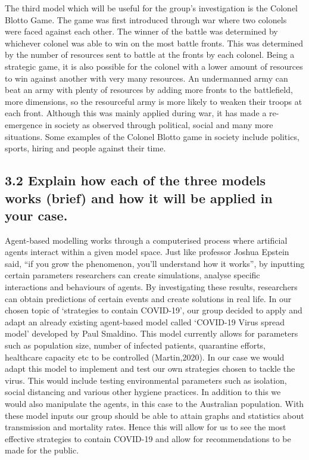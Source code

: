 \documentclass[11pt]{article}
\begin{document}
    The third model which will be useful for the group's investigation is
the Colonel Blotto Game. The game was first introduced through war where
two colonels were faced against each other. The winner of the battle was
determined by whichever colonel was able to win on the most battle
fronts. This was determined by the number of resources sent to battle at
the fronts by each colonel. Being a strategic game, it is also possible
for the colonel with a lower amount of resources to win against another
with very many resources. An undermanned army can beat an army with
plenty of resources by adding more fronts to the battlefield, more
dimensions, so the resourceful army is more likely to weaken their
troops at each front. Although this was mainly applied during war, it
has made a re-emergence in society as observed through political, social
and many more situations. Some examples of the Colonel Blotto game in
society include politics, sports, hiring and people against their time.

    \hypertarget{explain-how-each-of-the-three-models-works-brief-and-how-it-will-be-applied-in-your-case.}{%
\subsection{3.2 Explain how each of the three models works (brief) and
how it will be applied in your
case.}\label{explain-how-each-of-the-three-models-works-brief-and-how-it-will-be-applied-in-your-case.}}

    Agent-based modelling works through a computerised process where
artificial agents interact within a given model space. Just like
professor Joshua Epstein said, ``if you grow the phenomenon, you'll
understand how it works'', by inputting certain parameters researchers
can create simulations, analyse specific interactions and behaviours of
agents. By investigating these results, researchers can obtain
predictions of certain events and create solutions in real life. In our
chosen topic of `strategies to contain COVID-19', our group decided to
apply and adapt an already existing agent-based model called `COVID-19
Virus spread model' developed by Paul Smaldino. This model currently
allows for parameters such as population size, number of infected
patients, quarantine efforts, healthcare capacity etc to be controlled
(Martin,2020). In our case we would adapt this model to implement and
test our own strategies chosen to tackle the virus. This would include
testing environmental parameters such as isolation, social distancing
and various other hygiene practices. In addition to this we would also
manipulate the agents, in this case to the Australian population. With
these model inputs our group should be able to attain graphs and
statistics about transmission and mortality rates. Hence this will allow
for us to see the most effective strategies to contain COVID-19 and
allow for recommendations to be made for the public.
\end{document}
